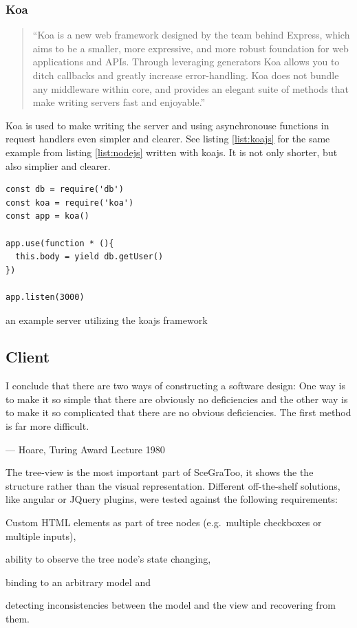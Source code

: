 \subsubsection{Koa}
\label{par:Koa}
\begin{quote}
  ``Koa is a new web framework designed by the team behind Express, which aims to be a smaller, more expressive, and more robust foundation for web applications and APIs. Through leveraging generators Koa allows you to ditch callbacks and greatly increase error-handling. Koa does not bundle any middleware within core, and provides an elegant suite of methods that make writing servers fast and enjoyable.'' \cite{koajs}
\end{quote}

Koa is used to make writing the server and using asynchronouse functions in request handlers even simpler and clearer.
See listing \ref{list:koajs} for the same example from listing \ref{list:nodejs} written with koajs.
It is not only shorter, but also simplier and clearer.

\begin{listing}
  \begin{verbatim}
const db = require('db')
const koa = require('koa')
const app = koa()

app.use(function * (){
  this.body = yield db.getUser()
})

app.listen(3000)
  \end{verbatim}
  \caption{an example server utilizing the koajs framework}
  \label{list:koajs}
\end{listing}

\subsection{Client}
\label{client}

\epigraph{I conclude that there are two ways of constructing a software design:
One way is to make it so simple that there are obviously no deficiencies
and the other way is to make it so complicated that there are no obvious
deficiencies. The first method is far more difficult.}{--- Hoare, Turing Award Lecture 1980}

The tree-view is the most important part of SceGraToo, it shows the
the structure rather than the visual representation. Different
off-the-shelf solutions, like angular or JQuery plugins, were tested
against the following requirements:

\begin{enumerate*}
  \item Custom \gls{HTML} elements as part of tree nodes (e.g.~multiple checkboxes or multiple inputs),
  \item ability to observe the tree node's state changing,
  \item binding to an arbitrary model and
  \item detecting inconsistencies between the model and the view and recovering from them.
\end{enumerate*}

